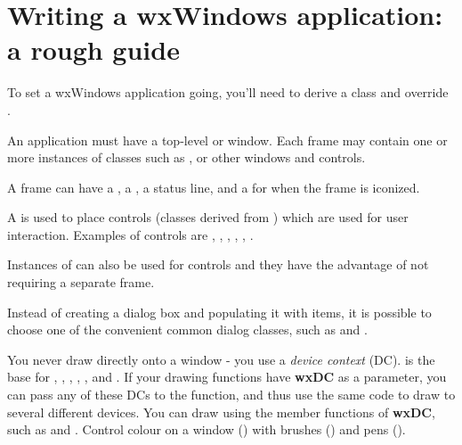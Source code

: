 \section{Writing a wxWindows application: a rough guide}\label{roughguide}

To set a wxWindows application going, you'll need to derive a  class and
override .

An application must have a top-level  or  window.
Each frame may contain one or more instances of classes such as , \rtfsp
or other windows and controls.

A frame can have a , a , a status line, and a  for
when the frame is iconized.

A  is used to place controls (classes derived from )
which are used for user interaction. Examples of controls are ,
\rtfsp{}, , ,
\rtfsp{}, .

Instances of  can also be used for controls and they have
the advantage of not requiring a separate frame.

Instead of creating a dialog box and populating it with items, it is possible to choose
one of the convenient common dialog classes, such as \rtfsp
and .

You never draw directly onto a window - you use a {\it device context} (DC).  is
the base for , , , ,
\rtfsp{},  and .
If your drawing functions have {\bf wxDC} as a parameter, you can pass any of these DCs
to the function, and thus use the same code to draw to several different devices.
You can draw using the member functions of {\bf wxDC}, such as \rtfsp
and . Control colour on a window () with
brushes () and pens ().

